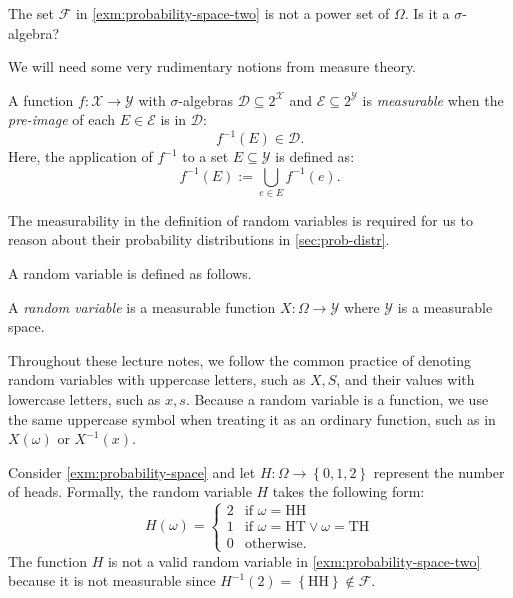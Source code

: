 \documentclass[letterpaper,11pt]{article}
\begin{document}
\begin{question}
The set $\mathcal{F}$ in \cref{exm:probability-space-two} is not a power set of $\Omega$. Is it a $\sigma$-algebra?
\end{question}

We will need some very rudimentary notions from measure theory.
\begin{defn} \label{def:preimage-measurable}
A function $f\colon \mathcal{X} \to \mathcal{Y}$ with $\sigma$-algebras $\mathcal{D} \subseteq 2^{\mathcal{X}}$ and $\mathcal{E} \subseteq 2^{\mathcal{Y}}$ is \emph{measurable} when the \emph{pre-image} of each $E\in \mathcal{E}$ is in $\mathcal{D}$:
  \[
    f^{-1}(E) \in \mathcal{D}.
  \]
Here, the application of $f^{-1}$ to a set $E \subseteq \mathcal{Y}$ is defined as:
\begin{equation} \label{eq:preimage-set}
f^{-1}(E) := \bigcup_{e \in E} f^{-1}(e) .
\end{equation}
\end{defn}
The measurability in the definition of random variables is required for us to reason about their probability distributions in \cref{sec:prob-distr}.

A random variable is defined as follows.
\begin{defn}
A \emph{random variable} is a measurable function $X\colon \Omega \to \mathcal{Y}$ where $\mathcal{Y}$ is a measurable space.
\end{defn}
Throughout these lecture notes, we follow the common practice of denoting random variables with uppercase letters, such as $X, S$, and their values with lowercase letters, such as $x, s$. Because a random variable is a function, we use the same uppercase symbol when treating it as an ordinary function, such as in $X(\omega)$ or $X^{-1}(x)$. 

\begin{example} \label{exm:heads}
Consider \cref{exm:probability-space} and let $H\colon \Omega \to \left\{ 0,1,2 \right\}$ represent the number of heads. Formally, the random variable $H$ takes the following form:
\begin{equation*}
  H(\omega) =
  \begin{cases}
    2 &\text{if } \omega = \mathrm{HH} \\
    1 &\text{if } \omega = \mathrm{HT} \vee \omega = \mathrm{TH} \\
    0 &\text{otherwise}.
  \end{cases}
\end{equation*}
The function $H$ is not a valid random variable in \cref{exm:probability-space-two} because it is not measurable since $H^{-1}(2) =  \left\{ \mathrm{HH}  \right\}  \notin \mathcal{F}$.
\end{example}
\end{document}
